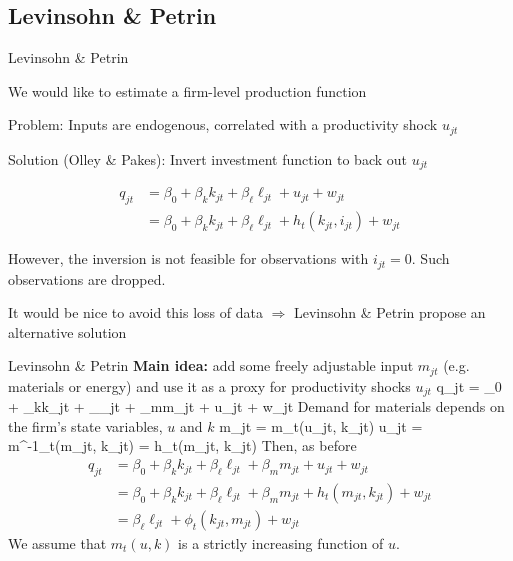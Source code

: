 \subsection{Levinsohn \& Petrin}

\begin{frame}{Levinsohn \& Petrin}
\bi
	\item{We would like to estimate a firm-level production function}
	\item{Problem: Inputs are endogenous, correlated with a productivity shock $u_{jt}$}
	\item{Solution (Olley \& Pakes): Invert investment function to back out $u_{jt}$}

\begin{align*}
	q_{jt} &= \beta_0 + \beta_kk_{jt} + \beta_\ell\ell_{jt} + u_{jt} + w_{jt}\\
	&= \beta_0 + \beta_kk_{jt} + \beta_\ell\ell_{jt} + h_t(k_{jt}, i_{jt}) + w_{jt}
\end{align*}
	\item{However, the inversion is not feasible for observations with $i_{jt} = 0$. Such observations are dropped.}
	\item{It would be nice to avoid this loss of data $\Longrightarrow$ Levinsohn \& Petrin propose an alternative solution}
	\ei
\end{frame}

\begin{frame}{Levinsohn \& Petrin}
	\textbf{Main idea:} add some freely adjustable input $m_{jt}$ (e.g. materials or energy) and use it as a proxy for productivity shocks $u_{jt}$
	\be
		q_{jt} = \beta_0 + \beta_kk_{jt} + \beta_\ell\ell_{jt} + \beta_mm_{jt} + u_{jt} + w_{jt}
	\ee
	Demand for materials depends on the firm's state variables, $u$ and $k$
	\be
		m_{jt} = m_t(u_{jt}, k_{jt}) \Longrightarrow u_{jt} = m^{-1}_t(m_{jt}, k_{jt}) = h_t(m_{jt}, k_{jt})
	\ee
	Then, as before
	\begin{align*}
			q_{jt} &= \beta_0 + \beta_kk_{jt} + \beta_\ell\ell_{jt} + \beta_mm_{jt} + u_{jt} + w_{jt}\\
			&= \beta_0 + \beta_kk_{jt} + \beta_\ell\ell_{jt} + \beta_mm_{jt} + h_t(m_{jt}, k_{jt}) + w_{jt}\\
			&= \beta_\ell\ell_{jt} + \phi_t(k_{jt}, m_{jt}) + w_{jt}
	\end{align*}
	We assume that $m_t(u,k)$ is a strictly increasing function of $u$.
\end{frame}

